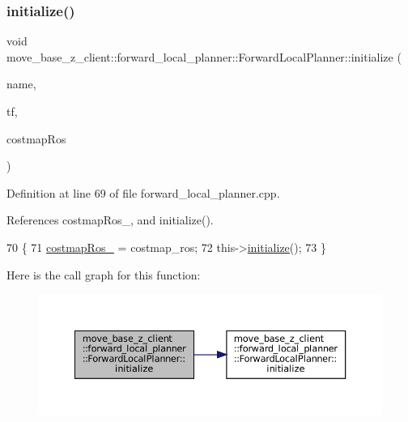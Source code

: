 \subsubsection{\texorpdfstring{initialize()}{initialize()}\hspace{0.1cm}{\footnotesize\ttfamily [2/3]}}
{\footnotesize\ttfamily void move\+\_\+base\+\_\+z\+\_\+client\+::forward\+\_\+local\+\_\+planner\+::\+Forward\+Local\+Planner\+::initialize (\begin{DoxyParamCaption}\item[{std\+::string}]{name,  }\item[{tf2\+\_\+ros\+::\+Buffer $\ast$}]{tf,  }\item[{costmap\+\_\+2d\+::\+Costmap2\+D\+R\+OS $\ast$}]{costmap\+Ros }\end{DoxyParamCaption})}



Definition at line 69 of file forward\+\_\+local\+\_\+planner.\+cpp.



References costmap\+Ros\+\_\+, and initialize().


\begin{DoxyCode}
70 \{
71     \hyperlink{classmove__base__z__client_1_1forward__local__planner_1_1ForwardLocalPlanner_a00139db9509e49ff456276a86785d234}{costmapRos\_} = costmap\_ros;
72     this->\hyperlink{classmove__base__z__client_1_1forward__local__planner_1_1ForwardLocalPlanner_a22add5a4eadd578341cabd55f2cd5c64}{initialize}();
73 \}
\end{DoxyCode}
Here is the call graph for this function\+:
\nopagebreak
\begin{figure}[H]
\begin{center}
\leavevmode
\includegraphics[width=350pt]{classmove__base__z__client_1_1forward__local__planner_1_1ForwardLocalPlanner_af25eaf2a889236efde7248d16fdd73c5_cgraph}
\end{center}
\end{figure}
\mbox{\label{classmove__base__z__client_1_1forward__local__planner_1_1ForwardLocalPlanner_a22add5a4eadd578341cabd55f2cd5c64}} 
